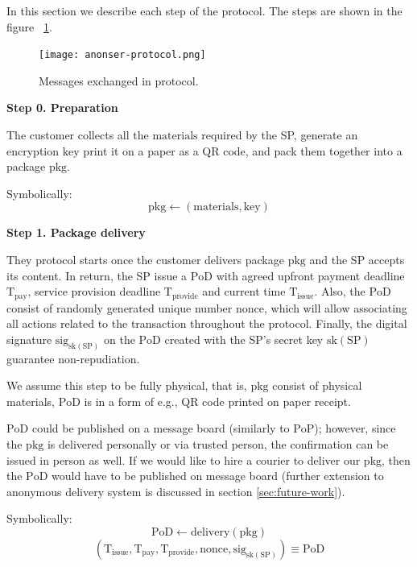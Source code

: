 \documentclass{ieeeaccess}
\begin{document}
In this section we describe each step of the protocol. The steps are
shown in the figure ~\ref{fig:protocol-diagram}.

\begin{figure}[h!]
\texttt{[image: anonser-protocol.png]}
\centering
\caption{Messages exchanged in protocol.}
\label{fig:protocol-diagram}
\end{figure}

\noindent \textbf
{Step 0.  Preparation}\label{step-0-preparation}

The customer collects all the $\mathrm{materials}$ required by the SP, generate an encryption $\mathrm{key}$ print it on a paper as a QR code, and pack them together into a package $\mathrm{pkg}$.

Symbolically: \[
\mathrm{pkg} \gets (\mathrm{materials}, \mathrm{key})
\]

\noindent \textbf
{Step 1. Package delivery}\label{step-1-package-delivery}

They protocol starts once the customer delivers package $\mathrm{pkg}$ and the SP accepts its content. In return, the SP issue a $\mathrm{PoD}$ with agreed upfront payment deadline $\mathrm{T}_\mathrm{pay}$, service provision deadline $\mathrm{T}_\mathrm{provide}$ and current time $\mathrm{T}_\mathrm{issue}$. Also, the $\mathrm{PoD}$ consist of randomly generated unique number $\mathrm{nonce}$, which will allow associating all actions related to the transaction throughout the protocol. Finally, the digital signature $\mathrm{sig}_{\mathrm{sk}(\mathrm{SP})}$ on the $\mathrm{PoD}$ created with the SP's secret key $\mathrm{sk}(\mathrm{SP})$ guarantee non-repudiation.

We assume this step to be fully physical, that is, $\mathrm{pkg}$ consist of physical materials, $\mathrm{PoD}$ is in a form of e.g., QR code printed on paper receipt. 

$\mathrm{PoD}$ could be published on a message board (similarly to $\mathrm{PoP}$); however, since the $\mathrm{pkg}$ is delivered personally or via trusted person, the confirmation can be issued in person as well. If we would like to hire a courier to deliver our $\mathrm{pkg}$, then the $\mathrm{PoD}$ would have to be published on message board (further extension to anonymous delivery system is discussed in section \ref{sec:future-work}).

Symbolically: 
\[
\mathrm{PoD} \gets \mathrm{delivery}(\mathrm{pkg})
\]
\[
(\mathrm{T}_\mathrm{issue}, \mathrm{T}_\mathrm{pay}, \mathrm{T}_\mathrm{provide}, \mathrm{nonce}, \mathrm{sig}_{\mathrm{sk}(\mathrm{SP})}) \equiv \mathrm{PoD}
\]
\end{document}
